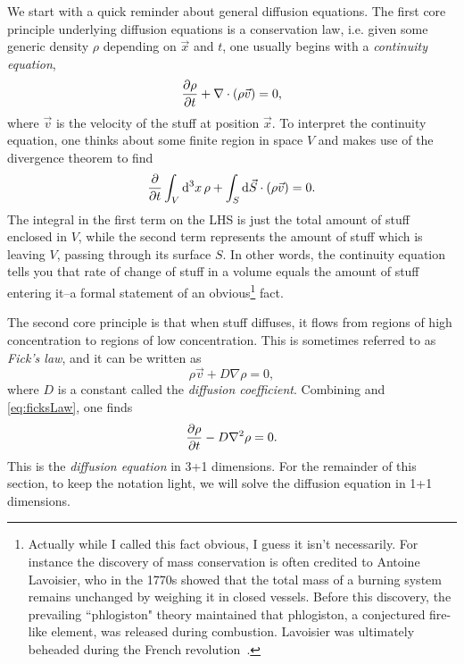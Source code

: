 We start with a quick reminder about general diffusion equations.
The first core
principle underlying diffusion equations is a conservation law, i.e.
given some generic density $\rho$ depending on $\vec{x}$ and $t$,
one usually begins with a {\it continuity equation},
\begin{equation}\label{eq:continuityEquation}
  \pder[\rho]{t}+\nabla\cdot\left(\rho\vec{v}\right)=0,
\end{equation}
where $\vec{v}$ is the velocity of the stuff at position $\vec{x}$. 
To interpret the continuity equation, one thinks about some finite region
in space $V$ and makes use of the divergence theorem to find
\begin{equation}
  \pder{t}\int_V \dd[3]{x}\rho
     +\int_{S}\dd{\vec{S}}\cdot\left(\rho\vec{v}\right)=0.
\end{equation}
The integral in the first term on the LHS is just the total amount of
stuff enclosed in $V$, while the second term represents the amount of
stuff which is leaving $V$, passing through its surface $S$. In other
words, the continuity equation tells you that rate of change of stuff
in a volume equals the amount of stuff entering it--a formal statement
of an obvious\footnote{Actually while I called this fact obvious,
I guess it isn't necessarily. For instance the discovery of mass conservation
is often credited to Antoine Lavoisier, who in the 1770s showed that 
the total mass of a burning system remains unchanged by weighing it
in closed vessels. Before this discovery, the prevailing ``phlogiston"
theory maintained that phlogiston, a conjectured fire-like element,
was released during combustion. Lavoisier was ultimately beheaded
during the French revolution~\cite{wiki:phlogiston,wiki:laviosier}.} fact. 

The second core principle is that when stuff diffuses, it flows from regions
of high concentration to regions of low concentration. This is
sometimes referred to as {\it Fick's law}, and it
can be written as
\begin{equation}\label{eq:ficksLaw}
  \rho\vec{v}+D\nabla\rho=0,
\end{equation}
where $D$ is a constant called the {\it diffusion coefficient}. Combining
 and \eqref{eq:ficksLaw}, one finds
\begin{equation}
  \pder[\rho]{t}-D\nabla^2\rho = 0.
\end{equation}
This is the {\it diffusion equation} in 3+1 dimensions. For the remainder
of this section, to keep the notation light, we will solve the diffusion
equation in 1+1 dimensions.

